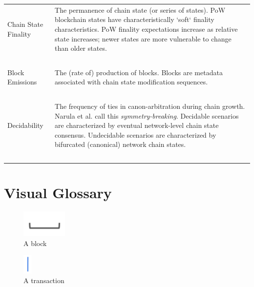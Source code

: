\documentclass[11pt]{article}
\theoremstyle{plain}
\begin{document}
\begin{table}[H]
{\begin{tabular}{|p{5cm}|p{9cm}|}
Chain State Finality &
The permanence of chain state (or series of states).
PoW blockchain states have characteristically `soft` finality characteristics.
PoW finality expectations increase as relative state increases;
newer states are more vulnerable to change than older states.
\\~\\

Block Emissions &
The (rate of) production of blocks. Blocks are metadata associated with chain state modification sequences.
\\~\\

Decidability &
The frequency of ties in canon-arbitration during chain growth.
Narula et al. call this \emph{symmetry-breaking}.
Decidable scenarios are characterized by eventual network-level chain state consensus.
Undecidable scenarios are characterized by bifurcated (canonical) network chain states.
\\~\\

\hline
\end{tabular}
}
\end{table}



\pagebreak
\section{\normalsize{Visual Glossary}}\label{sec: visual-glossary}

\begin{figure}[tph]
    \centering
    \includegraphics[width=0.2\textwidth]{imgs/vis_block.png}
    \caption{A block}
    \label{fig:block}
\end{figure}

\begin{figure}[tph]
    \centering
    \includegraphics[height=1cm]{imgs/vis_tx.png}
    \caption{A transaction}
    \label{fig:tx}
\end{figure}
\end{document}
